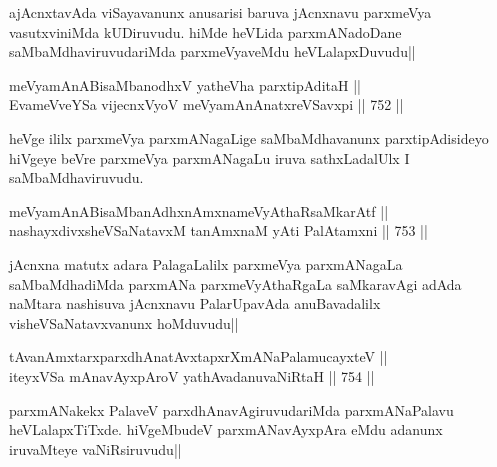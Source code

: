 \begin{artha} 
ajAcnxtavAda viSayavanunx anusarisi baruva jAcnxnavu parxmeVya 
vasutxviniMda kUDiruvudu. hiMde heVLida parxmANadoDane 
saMbaMdhaviruvudariMda parxmeVyaveMdu heVLalapxDuvudu||
\end{artha}


\begin{shl}
meVyamAnABisaMbanodhxV yatheVha parxtipAditaH || \\
EvameVveYSa vijecnxVyoV meVyamAnAnatxreVSavxpi ||  752 ||  
\end{shl}

\begin{artha} 
heVge ililx parxmeVya parxmANagaLige saMbaMdhavanunx parxtipAdisideyo 
hiVgeye beVre parxmeVya parxmANagaLu iruva sathxLadalUlx I 
saMbaMdhaviruvudu. 
\end{artha}

\begin{shl}
meVyamAnABisaMbanAdhxnAmxnameVyAthaRsaMkarAtf ||  \\
nashayxdivxsheVSaNatavxM tanAmxnaM yAti PalAtamxni ||  753 ||  
\end{shl}

\begin{artha} 
jAcnxna matutx adara PalagaLalilx parxmeVya parxmANagaLa 
saMbaMdhadiMda parxmANa parxmeVyAthaRgaLa saMkaravAgi adAda naMtara 
nashisuva jAcnxnavu PalarUpavAda anuBavadalilx visheVSaNatavxvanunx 
hoMduvudu||
\end{artha}

\begin{shl}
tAvanAmxtarxparxdhAnatAvxtapxrXmANaPalamucayxteV || \\
iteyxVSa mAnavAyxpAroV yathAvadanuvaNiRtaH ||  754 ||  
\end{shl}

\begin{artha} 
parxmANakekx PalaveV parxdhAnavAgiruvudariMda parxmANaPalavu 
heVLalapxTiTxde. hiVgeMbudeV parxmANavAyxpAra eMdu adanunx 
iruvaMteye vaNiRsiruvudu||
\end{artha}


